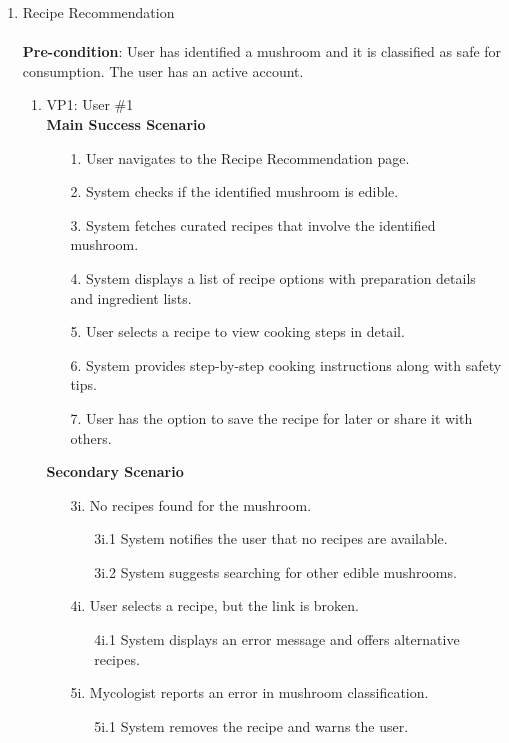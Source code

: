 \documentclass[]{article}
\begin{document}
\begin{enumerate}[{\bf BE1.}]
		\item Recipe Recommendation \\
		\\
		\textbf{Pre-condition}: User has identified a mushroom and it is classified as safe for consumption. The user has an active account.
		\begin{enumerate}[{\bf VP1.}]
			\item VP1: User \#1 \\
		\textbf{Main Success Scenario} 
			\begin{enumerate}
				\item[1.] User navigates to the Recipe Recommendation page.
				\item[2.] System checks if the identified mushroom is edible.
				\item[3.] System fetches curated recipes that involve the identified mushroom.
				\item[4.] System displays a list of recipe options with preparation details and ingredient lists.
				\item[5.] User selects a recipe to view cooking steps in detail.
				\item[6.] System provides step-by-step cooking instructions along with safety tips.
				\item[7.] User has the option to save the recipe for later or share it with others.
			\end{enumerate}
			
			\textbf{Secondary Scenario}
			\begin{enumerate}
				\item[3i.] No recipes found for the mushroom.
				\begin{enumerate}
					\item[3i.1] System notifies the user that no recipes are available.
					\item[3i.2] System suggests searching for other edible mushrooms.
				\end{enumerate}
				\item[4i.] User selects a recipe, but the link is broken.
				\begin{enumerate}
					\item[4i.1] System displays an error message and offers alternative recipes.
				\end{enumerate}
				\item[5i.] Mycologist reports an error in mushroom classification.
				\begin{enumerate}
					\item[5i.1] System removes the recipe and warns the user.
				\end{enumerate}
			\end{enumerate}
			

\end{enumerate}
\end{enumerate}
\end{document}
